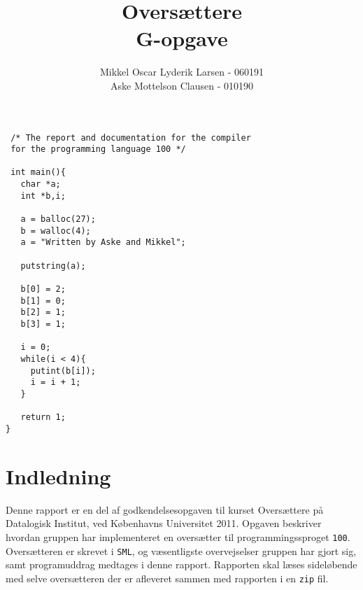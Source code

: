 \documentclass[12pt]{article}
\begin{document}
\author{Mikkel Oscar Lyderik Larsen - 060191 \\ Aske Mottelson Clausen - 010190}
\title{Oversættere \\ G-opgave}
\maketitle

\begin{verbatim}
 /* The report and documentation for the compiler
 for the programming language 100 */

 int main(){
   char *a;
   int *b,i;

   a = balloc(27);
   b = walloc(4);
   a = "Written by Aske and Mikkel";
 
   putstring(a);
 
   b[0] = 2;
   b[1] = 0;
   b[2] = 1;
   b[3] = 1;

   i = 0;
   while(i < 4){
     putint(b[i]);
     i = i + 1;
   }
 
   return 1;
}
\end{verbatim}



\newpage




\tableofcontents

\newpage 

\section*{Indledning}
Denne rapport er en del af godkendelsesopgaven til kurset Oversættere på
Datalogisk Institut, ved Københavns Universitet 2011. Opgaven beskriver hvordan
gruppen har implementeret en oversætter til programmingssproget \texttt{100}.
Oversætteren er skrevet i \texttt{SML}, og væsentligste overvejselser gruppen
har gjort sig, samt programuddrag medtages i denne rapport. Rapporten skal læses
sideløbende med selve oversætteren der er afleveret sammen med rapporten i en
\texttt{zip} fil.
\end{document}
